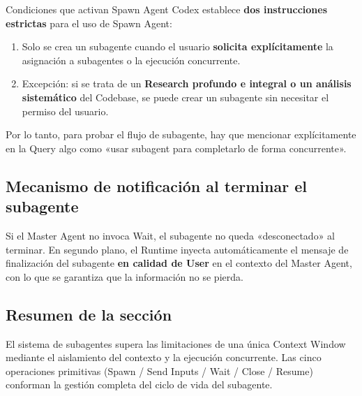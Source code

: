\begin{importantbox}{Condiciones que activan Spawn Agent}
Codex establece \textbf{dos instrucciones estrictas} para el uso de Spawn Agent:
\begin{enumerate}
    \item Solo se crea un subagente cuando el usuario \textbf{solicita explícitamente} la asignación a subagentes o la ejecución concurrente.
    \item Excepción: si se trata de un \textbf{Research profundo e integral o un análisis sistemático} del Codebase, se puede crear un subagente sin necesitar el permiso del usuario.
\end{enumerate}
Por lo tanto, para probar el flujo de subagente, hay que mencionar explícitamente en la Query algo como «usar subagent para completarlo de forma concurrente».
\end{importantbox}

\subsection{Mecanismo de notificación al terminar el subagente}

Si el Master Agent no invoca Wait, el subagente no queda «desconectado» al terminar. En segundo plano, el Runtime inyecta automáticamente el mensaje de finalización del subagente \textbf{en calidad de User} en el contexto del Master Agent, con lo que se garantiza que la información no se pierda.

\subsection{Resumen de la sección}

El sistema de subagentes supera las limitaciones de una única Context Window mediante el aislamiento del contexto y la ejecución concurrente. Las cinco operaciones primitivas (Spawn / Send Inputs / Wait / Close / Resume) conforman la gestión completa del ciclo de vida del subagente.

